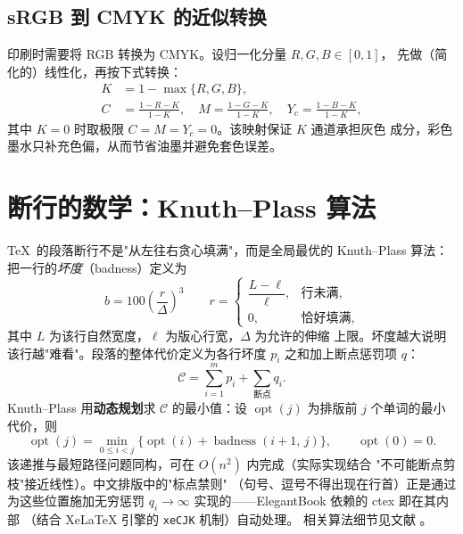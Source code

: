 \subsection{sRGB 到 CMYK 的近似转换}

印刷时需要将 RGB 转换为 CMYK。设归一化分量 $R,G,B\in[0,1]$，
先做（简化的）线性化，再按下式转换：
\begin{align}
  K &= 1 - \max\{R,G,B\},\\
  C &= \frac{1-R-K}{1-K},\quad
  M = \frac{1-G-K}{1-K},\quad
  Y_c = \frac{1-B-K}{1-K},
  \label{eq:cmyk}
\end{align}
其中 $K=0$ 时取极限 $C=M=Y_c=0$。该映射保证 $K$ 通道承担灰色
成分，彩色墨水只补充色偏，从而节省油墨并避免套色误差。

\section{断行的数学：Knuth--Plass 算法}

\TeX\ 的段落断行不是"从左往右贪心填满"，而是全局最优的
Knuth--Plass 算法：把一行的\emph{坏度}（badness）定义为
\begin{equation}
  b = 100 \left(\frac{r}{\Delta}\right)^{3}
  \qquad
  r = \begin{cases} \dfrac{L - \ell}{\ell}, & \text{行未满},\\[6pt]
                      0, & \text{恰好填满},\end{cases}
  \label{eq:badness}
\end{equation}
其中 $L$ 为该行自然宽度，$\ell$ 为版心行宽，$\Delta$ 为允许的伸缩
上限。坏度越大说明该行越"难看"。段落的整体代价定义为各行坏度
$p_i$ 之和加上断点惩罚项 $q$：
\begin{equation}
  \mathcal{C} = \sum_{i=1}^{m} p_i + \sum_{\text{断点}} q_i.
  \label{eq:cost}
\end{equation}
Knuth--Plass 用\textbf{动态规划}求 $\mathcal{C}$ 的最小值：设
$\operatorname{opt}(j)$ 为排版前 $j$ 个单词的最小代价，则
\begin{equation}
  \operatorname{opt}(j) = \min_{0\leqslant i<j}
  \bigl\{\operatorname{opt}(i) + \operatorname{badness}(i+1,\,j)\bigr\},
  \qquad
  \operatorname{opt}(0)=0.
  \label{eq:dp}
\end{equation}
该递推与最短路径问题同构，可在 $O(n^2)$ 内完成（实际实现结合
"不可能断点剪枝"接近线性）。中文排版中的"标点禁则"
（句号、逗号不得出现在行首）正是通过为这些位置施加无穷惩罚
$q_i\to\infty$ 实现的——ElegantBook 依赖的 ctex 即在其内部
（结合 XeLaTeX 引擎的 \texttt{xeCJK} 机制）自动处理。
相关算法细节见文献 \cite{knuth1984texbook,knuth1981breaking}。

